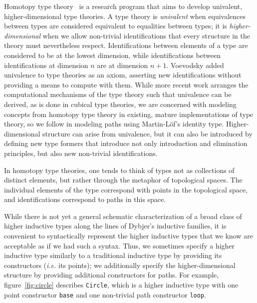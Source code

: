 \documentclass[sigplan,10pt]{acmart}
\begin{document}
Homotopy type theory~\cite{HoTT-2013} is a research program that aims to develop univalent, higher-dimensional type theories.
A type theory is \emph{univalent} when equivalences between types are considered equivalent to equalities between types; it is \emph{higher-dimensional} when we allow non-trivial identifications that every structure in the theory must nevertheless respect.
Identifications between elements of a type are considered to be at the lowest dimension, while identifications between identifications at dimension $n$ are at dimension $n+1$.
Voevodsky added univalence  to type theories as an axiom, asserting new identifications without providing a means to compute with them.
While more recent work arranges the computational mechanisms of the type theory such that univalence can be derived, as is done in cubical type theories, we are concerned with modeling concepts from homotopy type theory in existing, mature implementations of type theory, so we follow \citet{HoTT-2013} in modeling paths using Martin-Löf's identity type.
Higher-dimensional structure can arise from univalence, but it can also be introduced by defining new type formers that introduce not only introduction and elimination principles, but also new non-trivial identifications.

In homotopy type theories, one tends to think of types not as collections of distinct elements, but rather through the metaphor of topological spaces.
The individual elements of the type correspond with points in the topological space, and identifications correspond to paths in this space.



While there is not yet a general schematic characterization of a broad class of higher inductive types along the lines of Dybjer's inductive families, it is convenient to syntactically represent the higher inductive types that we know are acceptable as if we had such a syntax.
Thus, we sometimes specify a higher inductive type similarly to a traditional inductive type by providing its constructors (\textit{i.e.} its points); we additionally specify the higher-dimensional structure by providing additional constructors for paths. For example, figure~\ref{fig:circle} describes \Verb|Circle|, which is a higher inductive type with one point constructor \Verb|base| and one non-trivial path constructor \Verb|loop|.
\end{document}
